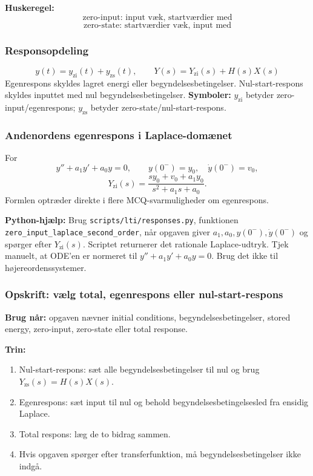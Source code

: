 \textbf{Huskeregel:}
\[
\text{zero-input: input væk, startværdier med}
\]
\[
\text{zero-state: startværdier væk, input med}
\]

\subsubsection{Responsopdeling}
\[
y(t)=y_{\mathrm{zi}}(t)+y_{\mathrm{zs}}(t),\qquad
Y(s)=Y_{\mathrm{zi}}(s)+H(s)X(s)
\]
Egenrespons skyldes lagret energi eller begyndelsesbetingelser. Nul-start-respons skyldes inputtet med nul begyndelsesbetingelser.
\textbf{Symboler:} \(y_{\mathrm{zi}}\) betyder zero-input/egenrespons; \(y_{\mathrm{zs}}\) betyder zero-state/nul-start-respons.

\subsubsection{Andenordens egenrespons i Laplace-domænet}
For
\[
y''+a_1y'+a_0y=0,\qquad y(0^-)=y_0,\quad \dot y(0^-)=v_0,
\]
\[
Y_{\mathrm{zi}}(s)=\frac{s y_0+v_0+a_1y_0}{s^2+a_1s+a_0}.
\]
Formlen optræder direkte i flere MCQ-svarmuligheder om egenrespons.

\textbf{Python-hjælp:} Brug \texttt{scripts/lti/responses.py}, funktionen \texttt{zero\_input\_laplace\_second\_order}, når opgaven giver \(a_1,a_0,y(0^-),\dot y(0^-)\) og spørger efter \(Y_{\mathrm{zi}}(s)\). Scriptet returnerer det rationale Laplace-udtryk. Tjek manuelt, at ODE'en er normeret til \(y''+a_1y'+a_0y=0\). Brug det ikke til højereordenssystemer.

\subsubsection{Opskrift: vælg total, egenrespons eller nul-start-respons}
\textbf{Brug når:} opgaven nævner initial conditions, begyndelsesbetingelser, stored energy, zero-input, zero-state eller total response.

\textbf{Trin:}
\begin{enumerate}
    \item Nul-start-respons: sæt alle begyndelsesbetingelser til nul og brug \(Y_{\mathrm{zs}}(s)=H(s)X(s)\).
    \item Egenrespons: sæt input til nul og behold begyndelsesbetingelsesled fra ensidig Laplace.
    \item Total respons: læg de to bidrag sammen.
    \item Hvis opgaven spørger efter transferfunktion, må begyndelsesbetingelser ikke indgå.
\end{enumerate}

